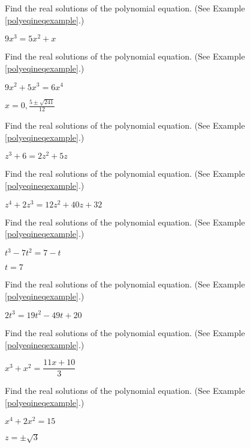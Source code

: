 \documentclass{ximera}
\begin{document}
\begin{problem}\label{polyequexerfirst}
Find the real solutions of the polynomial equation.  (See Example \ref{polyeqineqexample}.)

$9x^{3} = 5x^{2} + x$ 
\end{problem}
  
\begin{problem}
Find the real solutions of the polynomial equation.  (See Example \ref{polyeqineqexample}.)

$9x^{2}+5x^{3}= 6x^{4}$ 

\begin{solution}
$x = 0, \frac{5 \pm \sqrt{241}}{12}$
\end{solution}
\end{problem} 

\begin{problem}
Find the real solutions of the polynomial equation.  (See Example \ref{polyeqineqexample}.)

$z^{3} + 6 = 2z^{2} + 5z$ 
\end{problem} 

\begin{problem}
Find the real solutions of the polynomial equation.  (See Example \ref{polyeqineqexample}.)

$z^{4} + 2z^{3} = 12z^{2} + 40z + 32$ 
\end{problem} 

\begin{problem}
Find the real solutions of the polynomial equation.  (See Example \ref{polyeqineqexample}.)

$t^{3} - 7t^{2} = 7-t$

\begin{solution}
$t=7$
\end{solution}
\end{problem} 

\begin{problem}
Find the real solutions of the polynomial equation.  (See Example \ref{polyeqineqexample}.)

$2t^{3} = 19t^{2} - 49t + 20$ 
\end{problem}  

\begin{problem}
Find the real solutions of the polynomial equation.  (See Example \ref{polyeqineqexample}.)

$x^{3} + x^{2} = \dfrac{11x + 10}{3}$ 
\end{problem} 

\begin{problem}
Find the real solutions of the polynomial equation.  (See Example \ref{polyeqineqexample}.)

$x^4+2x^2 = 15$

\begin{solution}
$z = \pm \sqrt{3}$
\end{solution}
\end{problem}  
\end{document}
